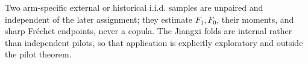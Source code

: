 Two arm-specific external or historical i.i.d. samples are unpaired and independent of the later assignment; they estimate \(F_1,F_0\), their moments, and sharp Fr\'echet endpoints, never a copula.  The Jiangxi folds are internal rather than independent pilots, so that application is explicitly exploratory and outside the pilot theorem.
